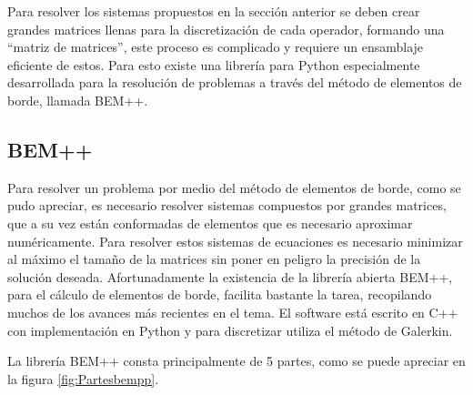 \documentclass[12pt,letterpaper]{article}
\numberwithin{equation}{section}
\begin{document}
Para resolver los sistemas propuestos en la sección anterior se deben crear grandes matrices llenas para la discretización de cada operador, formando una ``matriz de matrices'', este proceso es complicado y requiere un ensamblaje eficiente de estos. Para esto existe una librería para Python especialmente desarrollada para la resolución de problemas a través del método de elementos de borde, llamada BEM++.

\subsection{BEM++}

Para resolver un problema por medio del método de elementos de borde, como se pudo apreciar, es necesario resolver sistemas compuestos por grandes matrices, que a su vez están conformadas de elementos que es necesario aproximar numéricamente. Para resolver estos sistemas de ecuaciones es necesario minimizar al máximo el tamaño de la matrices sin poner en peligro la precisión de la solución deseada. Afortunadamente la existencia de la librería abierta BEM++, para el cálculo de elementos de borde, facilita bastante la tarea, recopilando muchos de los avances más recientes en el tema. El software está escrito en C++ con implementación en Python y para discretizar utiliza el método de Galerkin.

La librería BEM++ consta principalmente de 5 partes, como se puede apreciar en la figura \ref{fig:Partesbempp}.
\end{document}
